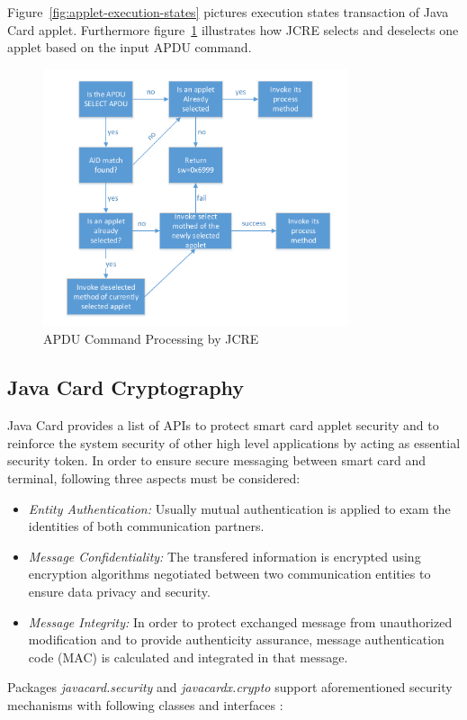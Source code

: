 Figure~\ref{fig:applet-execution-states} pictures execution states transaction of Java Card applet. Furthermore figure~\ref{fig:apdu-command-processing} illustrates how JCRE selects and deselects one applet based on the input APDU command.

\begin{figure}[!htbp]
	\centering
	\includegraphics[width=0.8\textwidth]{apdu-command-processing}
		\caption{APDU Command Processing by JCRE \cite{handbuch}}
	\label{fig:apdu-command-processing}
\end{figure}


\subsection{Java Card Cryptography}
Java Card provides a list of APIs to protect smart card applet security and to reinforce the system security of other high level applications by acting as essential security token. 
In order to ensure secure messaging between smart card and terminal, following three aspects must be considered:
\begin{itemize}
\item \emph{Entity Authentication:} Usually mutual authentication is applied to exam the identities of both communication partners.
\item \emph{Message Confidentiality:} The transfered information is encrypted using encryption algorithms negotiated between two communication entities to ensure data privacy and security.
\item \emph{Message Integrity:} In order to protect exchanged message from unauthorized modification and to provide authenticity assurance, message authentication code (MAC) is calculated and integrated in that message.
\end{itemize}
Packages \emph{javacard.security} and \emph{javacardx.crypto} support aforementioned security mechanisms with following classes and interfaces \cite{chen}:

